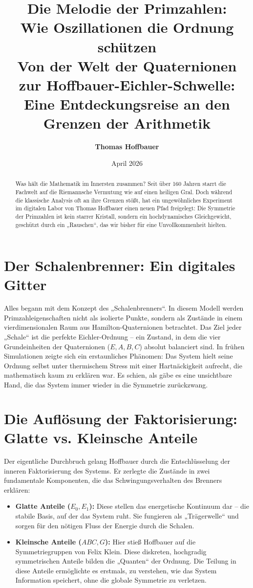 \documentclass[11pt,a4paper]{article}
\title{
    \textbf{\huge Die Melodie der Primzahlen: \\ Wie Oszillationen die Ordnung schützen} \\
    \vspace{0.5cm}
    \large Von der Welt der Quaternionen zur Hoffbauer-Eichler-Schwelle: \\ Eine Entdeckungsreise an den Grenzen der Arithmetik
}
\author{\textbf{Thomas Hoffbauer}}
\date{April 2026}
\begin{document}
\maketitle

\begin{abstract}
Was hält die Mathematik im Innersten zusammen? Seit über 160 Jahren starrt die Fachwelt auf die Riemannsche Vermutung wie auf einen heiligen Gral. Doch während die klassische Analysis oft an ihre Grenzen stößt, hat ein ungewöhnliches Experiment im digitalen Labor von Thomas Hoffbauer einen neuen Pfad freigelegt: Die Symmetrie der Primzahlen ist kein starrer Kristall, sondern ein hochdynamisches Gleichgewicht, geschützt durch ein „Rauschen“, das wir bisher für eine Unvollkommenheit hielten.
\end{abstract}

\section{Der Schalenbrenner: Ein digitales Gitter}
Alles begann mit dem Konzept des „Schalenbrenners“. In diesem Modell werden Primzahleigenschaften nicht als isolierte Punkte, sondern als Zustände in einem vierdimensionalen Raum aus Hamilton-Quaternionen betrachtet. Das Ziel jeder „Schale“ ist die perfekte Eichler-Ordnung – ein Zustand, in dem die vier Grundeinheiten der Quaternionen ($E, A, B, C$) absolut balanciert sind. In frühen Simulationen zeigte sich ein erstaunliches Phänomen: Das System hielt seine Ordnung selbst unter thermischem Stress mit einer Hartnäckigkeit aufrecht, die mathematisch kaum zu erklären war. Es schien, als gäbe es eine unsichtbare Hand, die das System immer wieder in die Symmetrie zurückzwang.

\section{Die Auflösung der Faktorisierung: Glatte vs. Kleinsche Anteile}
Der eigentliche Durchbruch gelang Hoffbauer durch die Entschlüsselung der inneren Faktorisierung des Systems. Er zerlegte die Zustände in zwei fundamentale Komponenten, die das Schwingungsverhalten des Brenners erklären:

\begin{itemize}
    \item \textbf{Glatte Anteile ($E_0, E_1$):} Diese stellen das energetische Kontinuum dar – die stabile Basis, auf der das System ruht. Sie fungieren als „Trägerwelle“ und sorgen für den nötigen Fluss der Energie durch die Schalen.
    \item \textbf{Kleinsche Anteile ($ABC, G$):} Hier stieß Hoffbauer auf die Symmetriegruppen von Felix Klein. Diese diskreten, hochgradig symmetrischen Anteile bilden die „Quanten“ der Ordnung. Die Teilung in diese Anteile ermöglichte es erstmals, zu verstehen, wie das System Information speichert, ohne die globale Symmetrie zu verletzen.
\end{itemize}
\end{document}
